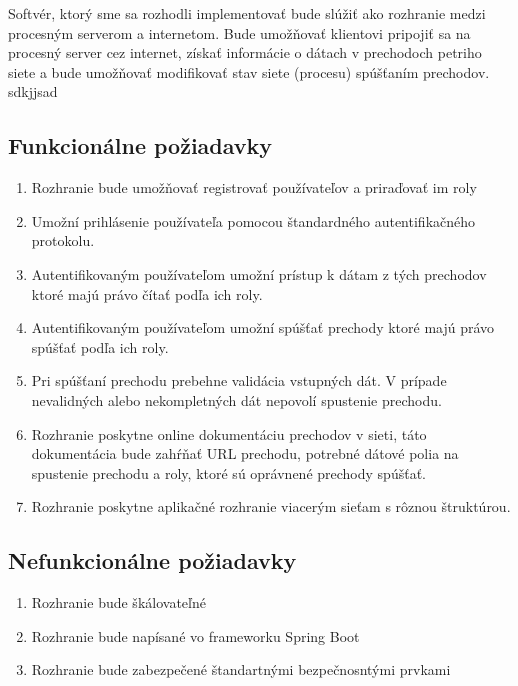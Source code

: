 Softvér, ktorý sme sa rozhodli implementovať bude slúžiť ako rozhranie medzi procesným serverom a internetom. Bude umožňovať klientovi pripojiť sa na procesný server cez internet, získať informácie o dátach v prechodoch petriho siete a bude umožňovať modifikovať stav siete (procesu) spúšťaním prechodov.  
\cite{t01} sdkjjsad
  

\subsection{Funkcionálne požiadavky} 

\begin{enumerate} 

    \item Rozhranie bude umožňovať registrovať používateľov a priraďovať im roly 

    \item Umožní prihlásenie používateľa pomocou štandardného autentifikačného protokolu. 

    \item Autentifikovaným používateľom umožní prístup k dátam z tých prechodov ktoré majú právo čítať podľa ich roly. 

    \item Autentifikovaným používateľom umožní spúšťať prechody ktoré majú právo spúšťať podľa ich roly. 

    \item Pri spúšťaní prechodu prebehne validácia vstupných dát. V prípade nevalidných alebo nekompletných dát nepovolí spustenie prechodu. 

    \item Rozhranie poskytne online dokumentáciu prechodov v sieti, táto dokumentácia bude zahŕňať URL prechodu, potrebné dátové polia na spustenie prechodu a roly, ktoré sú oprávnené prechody spúšťať. 

    \item Rozhranie poskytne aplikačné rozhranie viacerým sieťam s rôznou štruktúrou. 

\end{enumerate}     

  

 
  

\subsection{Nefunkcionálne požiadavky} 

\begin{enumerate} 

    \item Rozhranie bude škálovateľné 
    \item Rozhranie bude napísané vo frameworku Spring Boot 
    \item Rozhranie bude zabezpečené štandartnými bezpečnosntými prvkami
	
\end{enumerate} 

